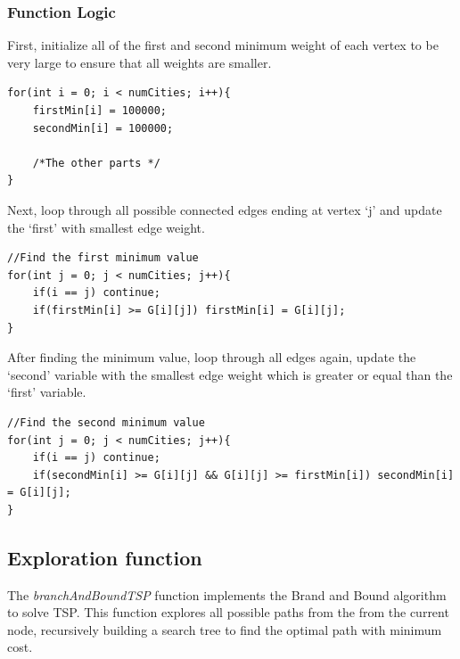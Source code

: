 \documentclass[a4paper]{article}
\begin{document}
\subsubsection{Function Logic}
First, initialize all of the first and second minimum weight of each vertex to be very large to ensure that all weights are smaller.
\begin{verbatim}
for(int i = 0; i < numCities; i++){
    firstMin[i] = 100000;
    secondMin[i] = 100000;

    /*The other parts */
}
\end{verbatim}
Next, loop through all possible connected edges ending at vertex `j' and update the `first' with smallest edge weight.
\begin{verbatim}
//Find the first minimum value
for(int j = 0; j < numCities; j++){
    if(i == j) continue;
    if(firstMin[i] >= G[i][j]) firstMin[i] = G[i][j];
}
\end{verbatim}
After finding the minimum value, loop through all edges again, update the `second' variable with the smallest edge weight which is greater or equal than the `first' variable.
\begin{verbatim}
//Find the second minimum value
for(int j = 0; j < numCities; j++){
    if(i == j) continue;
    if(secondMin[i] >= G[i][j] && G[i][j] >= firstMin[i]) secondMin[i] = G[i][j];
}
\end{verbatim}
\subsection{Exploration function}
The \textit{branchAndBoundTSP} function implements the Brand and Bound algorithm to solve TSP. This function explores all possible paths from the from the current node, recursively building a search tree to find the optimal path with minimum cost.
\end{document}
